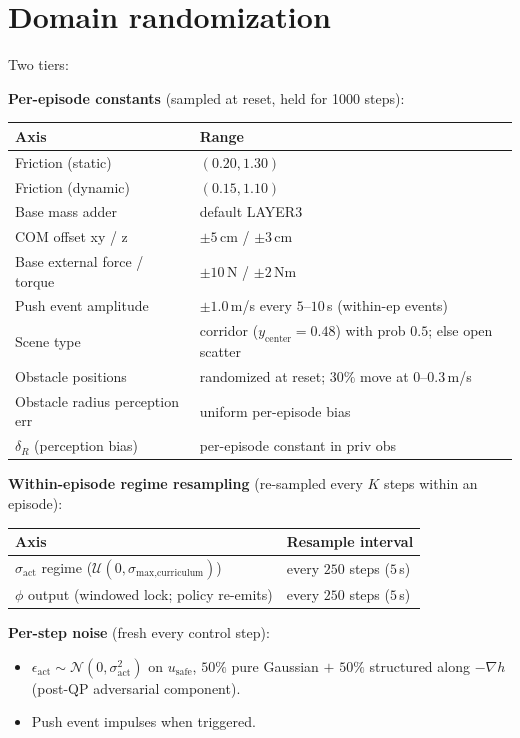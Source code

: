 \documentclass[11pt]{article}
\begin{document}
\section*{Domain randomization}

Two tiers:

\textbf{Per-episode constants} (sampled at reset, held for 1000 steps):
\begin{center}
\begin{tabular}{@{}l l@{}}
\toprule
Axis & Range \\
\midrule
Friction (static)              & $(0.20, 1.30)$ \\
Friction (dynamic)             & $(0.15, 1.10)$ \\
Base mass adder                & default LAYER3 \\
COM offset xy / z              & $\pm 5$\,cm / $\pm 3$\,cm \\
Base external force / torque   & $\pm 10$\,N / $\pm 2$\,Nm \\
Push event amplitude           & $\pm 1.0$\,m/s every $5$--$10$\,s (within-ep events) \\
Scene type                     & corridor ($y_\text{center}=0.48$) with prob $0.5$; else open scatter \\
Obstacle positions             & randomized at reset; $30\%$ move at $0$--$0.3$\,m/s \\
Obstacle radius perception err & uniform per-episode bias \\
$\delta_R$ (perception bias)   & per-episode constant in priv obs \\
\bottomrule
\end{tabular}
\end{center}

\textbf{Within-episode regime resampling} (re-sampled every $K$ steps within an episode):
\begin{center}
\begin{tabular}{@{}l l@{}}
\toprule
Axis & Resample interval \\
\midrule
$\sigma_\text{act}$ regime ($\mathcal{U}(0, \sigma_\text{max,curriculum})$) & every $250$ steps ($5$\,s) \\
$\phi$ output (windowed lock; policy re-emits) & every $250$ steps ($5$\,s) \\
\bottomrule
\end{tabular}
\end{center}

\textbf{Per-step noise} (fresh every control step):
\begin{itemize}
\item $\epsilon_\text{act} \sim \mathcal{N}(0, \sigma_\text{act}^2)$ on $u_\text{safe}$, $50\%$ pure Gaussian $+$ $50\%$ structured along $-\nabla h$ (post-QP adversarial component).
\item Push event impulses when triggered.
\end{itemize}
\end{document}
